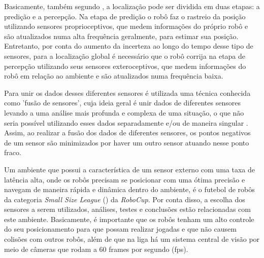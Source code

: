 \documentclass[acronym, symbols, table, deposito]{fei}
\begin{document}
	
	Basicamente, também segundo \textcite{PANIGRAHI20226019}, a localização pode ser dividida em duas etapas: a predição e a percepção. Na etapa de predição o robô faz o rastreio da posição utilizando sensores proprioceptivos, que medem informações do próprio robô e são atualizados numa alta frequência geralmente, para estimar sua posição. Entretanto, por conta do aumento da incerteza ao longo do tempo desse tipo de sensores, para a localização global é necessário que o robô corrija na etapa de percepção utilizando seus sensores exteroceptivos, que medem informações do robô em relação ao ambiente e são atualizados numa frequência baixa.
	
	Para unir os dados desses diferentes sensores é utilizada uma técnica conhecida como 'fusão de sensores', cuja ideia geral é unir dados de diferentes sensores levando a uma análise mais profunda e complexa de uma situação, o que não seria possível utilizando esses dados separadamente e/ou de maneira singular \cite{s16101569}. Assim, ao realizar a fusão dos dados de diferentes sensores, os pontos negativos de um sensor são minimizados por haver um outro sensor atuando nesse ponto fraco.
	
	Um ambiente que possui a característica de um sensor externo com uma taxa de latência alta, onde os robôs precisam se posicionar com uma ótima precisão e navegam de maneira rápida e dinâmica dentro do ambiente, é o futebol de robôs da categoria \textit{Small Size League} () da \textit{RoboCup}. Por conta disso, a escolha dos sensores a serem utilizados, análises, testes e conclusões estão relacionadas com este ambiente. Basicamente, é importante que os robôs tenham um alto controle do seu posicionamento para que possam realizar jogadas e que não causem colisões com outros robôs, além de que na liga há um sistema central de visão por meio de câmeras que rodam a 60 frames por segundo (fps).
	
\end{document}

